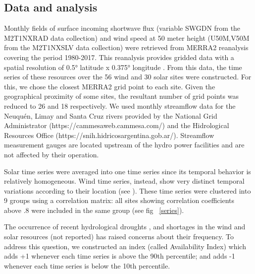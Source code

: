 \documentclass[AMA,Times1COL]{WileyNJDv5} %
\begin{document}
\begin{linenumbers}
\subsection{Data and analysis}

Monthly fields of surface incoming shortwave flux (variable SWGDN from the M2T1NXRAD data collection) and wind speed at 50 meter height (U50M,V50M from the M2T1NXSLV data collection) were retrieved from MERRA2 reanalysis \cite{gelaro2017modern} covering the period 1980-2017. This reanalysis provides gridded data with a spatial resolution of 0.5° latitude x 0.375° longitude \cite{bosilovich2015merra}. From this data, the time series of these resources over the 56 wind and 30 solar sites were constructed. For this, we chose the closest MERRA2 grid point to each site. Given the geographical proximity of some sites, the resultant number of grid points was reduced to 26 and 18 respectively. We used monthly streamflow data for the Neuquén, Limay and Santa Cruz rivers provided by the National Grid Administrator (https://cammesaweb.cammesa.com/) and the Hidrological Resources Office (https://snih.hidricosargentina.gob.ar/). Streamflow measurement gauges are located upstream of the hydro power facilities and are not affected by their operation.

Solar time series were averaged into one time series since its temporal behavior is relatively homogeneous. Wind time series, instead, show very distinct temporal variations according to their location (see \cite{bianchi2019spatiotemporal}). These time series were clustered into 9 groups using a correlation matrix: all sites showing correlation coefficients above .8 were included in the same group (see fig ~\ref{series}).

The occurrence of recent hydrological droughts \cite{aguayo2021hydrological}, and shortages in the wind and solar resources (not reported) has raised concerns about their frequency. To address this question, we constructed an index (called Availability Index) which adds +1 whenever each time series is above the 90th percentile; and adds -1 whenever each time series is below the 10th percentile. 


\end{linenumbers}
\end{document}
